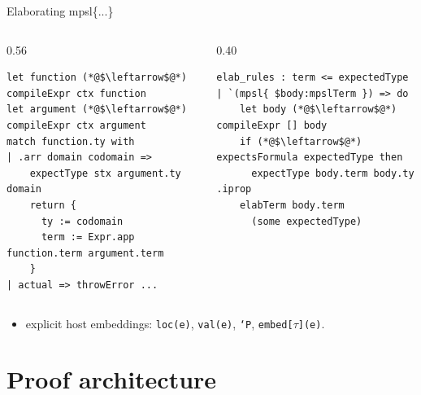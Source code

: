 \documentclass[10pt,aspectratio=169]{beamer}
\begin{document}
\begin{frame}[fragile]{Elaborating mpsl\{...\}}
  \begin{columns}[T,onlytextwidth]
    \begin{column}{0.56\textwidth}
\begin{lstlisting}[style=leancode,basicstyle=\ttfamily\tiny]
let function (*@$\leftarrow$@*) compileExpr ctx function
let argument (*@$\leftarrow$@*) compileExpr ctx argument
match function.ty with
| .arr domain codomain =>
    expectType stx argument.ty domain
    return {
      ty := codomain
      term := Expr.app function.term argument.term
    }
| actual => throwError ...
\end{lstlisting}
    \end{column}
    \begin{column}{0.40\textwidth}
\begin{lstlisting}[style=leancode,basicstyle=\ttfamily\tiny]
elab_rules : term <= expectedType
| `(mpsl{ $body:mpslTerm }) => do
    let body (*@$\leftarrow$@*) compileExpr [] body
    if (*@$\leftarrow$@*) expectsFormula expectedType then
      expectType body.term body.ty .iprop
    elabTerm body.term
      (some expectedType)
\end{lstlisting}
    \end{column}
  \end{columns}

  \vspace{0.25cm}
  \begin{itemize}
    \item explicit host embeddings: \texttt{loc(e)}, \texttt{val(e)}, \texttt{`P}, \texttt{embed[$\tau$](e)}.
  \end{itemize}
\end{frame}

\section{Proof architecture}
\end{document}
